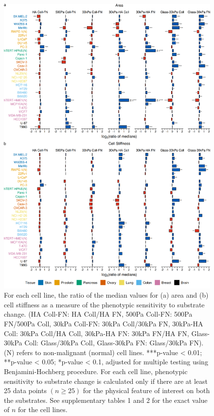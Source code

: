 \documentclass[11pt,letterpaper,english,oneside]{article} %
\begin{document}
\begin{figure}[H]
    \vspace*{-0.65cm}
    \centering
    \includegraphics{../Figures/Supplementary_Figure2/supplementary_figure2.png}
    \caption{For each cell line, the ratio of the median values for (a) area and (b) cell stiffness as a measure of the phenotypic sensitivity to substrate change. 
    (HA Coll-FN: HA Coll/HA FN, 500Pa Coll-FN: 500Pa FN/500Pa Coll, 30kPa Coll-FN: 30kPa Coll/30kPa FN, 30kPa-HA Coll: 30kPa Coll/HA Coll, 30kPa-HA FN: 30kPa FN/HA FN, 
    Glass-30kPa Coll: Glass/30kPa Coll, Glass-30kPa FN: Glass/30kPa FN). (N) refers to non-malignant (normal) cell lines. 
    ***p-value < 0.01; **p-value < 0.05; *p-value < 0.1, adjusted for multiple testing using Benjamini-Hochberg procedure. 
    For each cell line, phenotypic sensitivity to substrate change is calculated only if there are at least 25 data points $(n \geq 25)$ for the physical feature of interest on both the substrates.
    See supplementary tables 1 and 2 for the exact value of $n$ for the cell lines.}
    \label{fig:fig2}
\end{figure}
\end{document}
